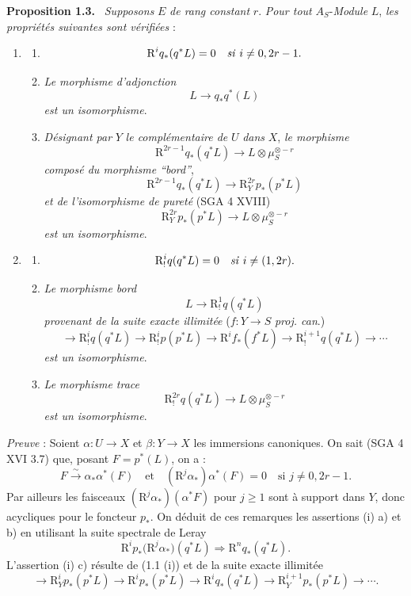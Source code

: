 \documentclass[11pt]{article}
\newenvironment{statement}[1]{\par\medskip\noindent\textbf{#1.}\ }{\par\medskip}
\begin{document}
\begin{statement}{Proposition 1.3}
\emph{Supposons} $E$ \emph{de rang constant} $r$. \emph{Pour tout} $A_S$-\emph{Module} $L$, \emph{les propriétés suivantes sont vérifiées} :
\begin{enumerate}[label=(\roman*)]
\item
\begin{enumerate}[label=\alph*)]
\item
\[
\mathrm{R}^i q_*(q^*L)=0\quad\text{\emph{si} }i\ne 0,2r-1.
\]
\item \emph{Le morphisme d'adjonction}
\[
L\longrightarrow q_*q^*(L)
\]
\emph{est un isomorphisme}.
\item \emph{Désignant par} $Y$ \emph{le complémentaire de} $U$
\emph{dans} $X$, \emph{le morphisme}
\[
\mathrm{R}^{2r-1}q_*(q^*L)\longrightarrow L\otimes\mu_S^{\otimes -r}
\]
\emph{composé du morphisme ``bord''},
\[
\mathrm{R}^{2r-1}q_*(q^*L)\longrightarrow \mathrm{R}_Y^{2r}p_*(p^*L)
\tag{1}
\]
\emph{et de l'isomorphisme de pureté} (SGA 4 XVIII)
\[
\mathrm{R}_Y^{2r}p_*(p^*L)\longrightarrow L\otimes\mu_S^{\otimes -r}
\]
\emph{est un isomorphisme}.
\end{enumerate}
\item
\begin{enumerate}[label=\alph*)]
\item
\[
\mathrm{R}_!^i q(q^*L)=0\quad\text{\emph{si} }i\ne (1,2r).
\]
\item \emph{Le morphisme bord}
\[
L\longrightarrow \mathrm{R}_!^1 q(q^*L)
\]
\emph{provenant de la suite exacte illimitée} ($f:Y\to S$ \emph{proj. can}.)
\[
\longrightarrow \mathrm{R}_!^i q(q^*L)\longrightarrow \mathrm{R}_!^i p(p^*L)
\longrightarrow \mathrm{R}^i f_*(f^*L)\longrightarrow \mathrm{R}_!^{i+1}q(q^*L)\longrightarrow\cdots
\]
\emph{est un isomorphisme}.
\item \emph{Le morphisme trace}
\[
\mathrm{R}_!^{2r}q(q^*L)\longrightarrow L\otimes\mu_S^{\otimes -r}
\]
\emph{est un isomorphisme}.
\end{enumerate}
\end{enumerate}
\end{statement}

\emph{Preuve} : Soient $\alpha:U\to X$ et $\beta:Y\to X$ les immersions canoniques. On sait (SGA 4 XVI 3.7) que, posant $F=p^*(L)$, on a :
\[
F\xrightarrow{\sim}\alpha_*\alpha^*(F)
\quad\text{et}\quad
(\mathrm{R}^j\alpha_*)\alpha^*(F)=0\quad\text{si }j\ne0,2r-1.
\]
Par ailleurs les faisceaux $(\mathrm{R}^j\alpha_*)(\alpha^*F)$ pour $j\ge1$ sont à support dans $Y$, donc acycliques pour le foncteur $p_*$. On déduit de ces remarques les assertions (i) a) et b) en utilisant la suite spectrale de Leray
\[
\mathrm{R}^i p_*\bigl(\mathrm{R}^j\alpha_*\bigr)(q^*L)\Longrightarrow \mathrm{R}^n q_*(q^*L).
\]
L'assertion (i) c) résulte de (1.1 (i)) et de la suite exacte illimitée
\[
\longrightarrow \mathrm{R}_Y^i p_*(p^*L)\longrightarrow \mathrm{R}^i p_*(p^*L)\longrightarrow \mathrm{R}^i q_*(q^*L)
\longrightarrow \mathrm{R}_Y^{i+1}p_*(p^*L)\longrightarrow\cdots.
\]
\end{document}
